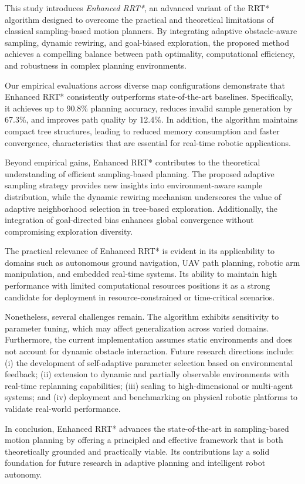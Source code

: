 \documentclass[pdflatex,sn-mathphys-num]{sn-jnl}
\theoremstyle{thmstyleone}%
\theoremstyle{thmstyletwo}%
\theoremstyle{thmstylethree}%
\begin{document}
This study introduces \textit{Enhanced RRT*}, an advanced variant of the RRT* algorithm designed to overcome the practical and theoretical limitations of classical sampling-based motion planners. By integrating adaptive obstacle-aware sampling, dynamic rewiring, and goal-biased exploration, the proposed method achieves a compelling balance between path optimality, computational efficiency, and robustness in complex planning environments.

Our empirical evaluations across diverse map configurations demonstrate that Enhanced RRT* consistently outperforms state-of-the-art baselines. Specifically, it achieves up to 90.8\% planning accuracy, reduces invalid sample generation by 67.3\%, and improves path quality by 12.4\%. In addition, the algorithm maintains compact tree structures, leading to reduced memory consumption and faster convergence, characteristics that are essential for real-time robotic applications.

Beyond empirical gains, Enhanced RRT* contributes to the theoretical understanding of efficient sampling-based planning. The proposed adaptive sampling strategy provides new insights into environment-aware sample distribution, while the dynamic rewiring mechanism underscores the value of adaptive neighborhood selection in tree-based exploration. Additionally, the integration of goal-directed bias enhances global convergence without compromising exploration diversity.

The practical relevance of Enhanced RRT* is evident in its applicability to domains such as autonomous ground navigation, UAV path planning, robotic arm manipulation, and embedded real-time systems. Its ability to maintain high performance with limited computational resources positions it as a strong candidate for deployment in resource-constrained or time-critical scenarios.

Nonetheless, several challenges remain. The algorithm exhibits sensitivity to parameter tuning, which may affect generalization across varied domains. Furthermore, the current implementation assumes static environments and does not account for dynamic obstacle interaction. Future research directions include: (i) the development of self-adaptive parameter selection based on environmental feedback; (ii) extension to dynamic and partially observable environments with real-time replanning capabilities; (iii) scaling to high-dimensional or multi-agent systems; and (iv) deployment and benchmarking on physical robotic platforms to validate real-world performance.

In conclusion, Enhanced RRT* advances the state-of-the-art in sampling-based motion planning by offering a principled and effective framework that is both theoretically grounded and practically viable. Its contributions lay a solid foundation for future research in adaptive planning and intelligent robot autonomy.


\end{document}
